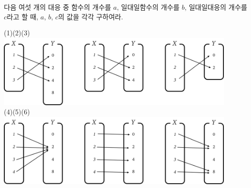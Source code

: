 \documentclass{oblivoir}
\begin{document}
%
\prob{}\label{various3}
다음 여섯 개의 대응 중 함수의 개수를 \(a\), 일대일함수의 개수를 \(b\),  일대일대응의 개수를 \(c\)라고 할 때, \(a\), \(b\), \(c\)의 값을 각각 구하여라.
\begin{center}
(1)\hspace{100pt}(2)\hspace{100pt}(3)\\
\includegraphics[width=0.9\textwidth]{various_3-1}\\[10pt]
(4)\hspace{100pt}(5)\hspace{100pt}(6)\\
\includegraphics[width=0.9\textwidth]{various_3-2}
\end{center}
\end{document}
